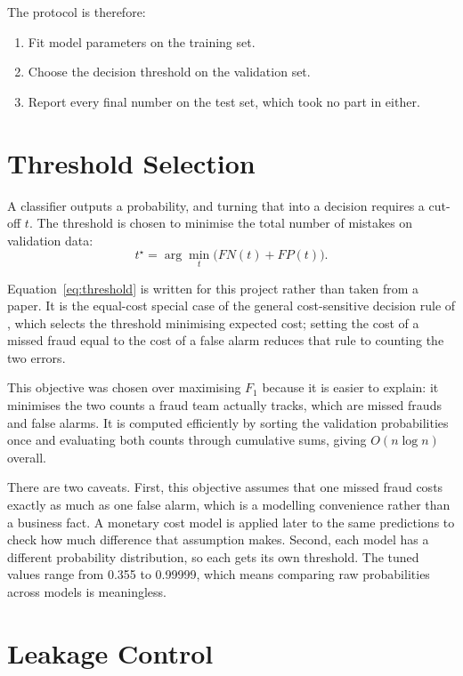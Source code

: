 The protocol is therefore:
\begin{enumerate}
  \item Fit model parameters on the training set.
  \item Choose the decision threshold on the validation set.
  \item Report every final number on the test set, which took no part in either.
\end{enumerate}

\section{Threshold Selection}
\label{sec:threshold}

A classifier outputs a probability, and turning that into a decision requires a cut-off $t$.
The threshold is chosen to minimise the total number of mistakes on validation data:
\begin{equation}
  \label{eq:threshold}
  t^{\star} = \arg\min_{t} \Big( FN(t) + FP(t) \Big).
\end{equation}

Equation~\ref{eq:threshold} is written for this project rather than taken from a paper. It
is the equal-cost special case of the general cost-sensitive decision rule of
\citet{elkan2001foundations}, which selects the threshold minimising expected cost; setting
the cost of a missed fraud equal to the cost of a false alarm reduces that rule to counting
the two errors.

This objective was chosen over maximising $F_1$ because it is easier to explain: it
minimises the two counts a fraud team actually tracks, which are missed frauds and false
alarms. It is computed efficiently by sorting the validation probabilities once and
evaluating both counts through cumulative sums, giving $O(n \log n)$ overall.

There are two caveats. First, this objective assumes that one missed fraud costs exactly as
much as one false alarm, which is a modelling convenience rather than a business fact. A
monetary cost model is applied later to the same predictions to check how much difference
that assumption makes. Second, each model has a different probability distribution, so each
gets its own threshold. The tuned values range from 0.355 to 0.99999, which means comparing
raw probabilities across models is meaningless.

\section{Leakage Control}
\label{sec:leakage}

